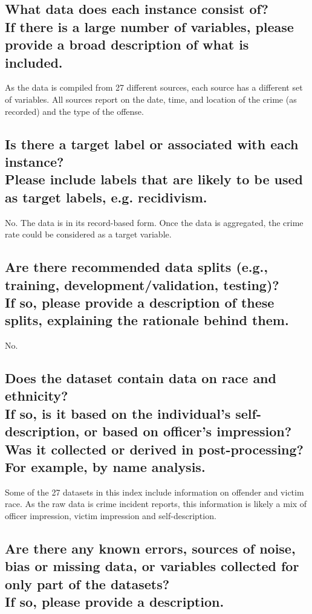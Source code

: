 \documentclass[letterpaper, 10 pt, conference]{ieeeconf}  %
\newcommand{\subtitle}[1]{{\\ \small \normalfont \color{purple} #1}}
\begin{document}
\subsection{What data does each instance consist of? \subtitle{If there is a large number of variables, please provide a broad description of what is included.}}

As the data is compiled from 27 different sources, each source has a different set of variables. All sources report on the date, time, and location of the crime (as recorded) and the type of the offense.  

\subsection{Is there a target label or associated with each instance? \subtitle{Please include labels that are likely to be used as target labels, e.g. recidivism.}}

No. The data is in its record-based form. Once the data is aggregated, the crime rate could be considered as a target variable.

\subsection{Are there recommended data splits (e.g., training, development/validation, testing)? \subtitle{If so, please provide a description of these splits, explaining the rationale behind them.}}

No.

\subsection{Does the dataset contain data on race and ethnicity? \subtitle{If so, is it based on the individual's self-description, or based on officer's impression? Was it collected or derived in post-processing? For example, by name analysis.}}

Some of the 27 datasets in this index include information on offender and victim race. As the raw data is crime incident reports, this information is likely a mix of officer impression, victim impression and self-description.

\subsection{Are there any known errors, sources of noise, bias or missing data, or variables collected for only part of the datasets? \subtitle{If so, please provide a description.}}
\end{document}
